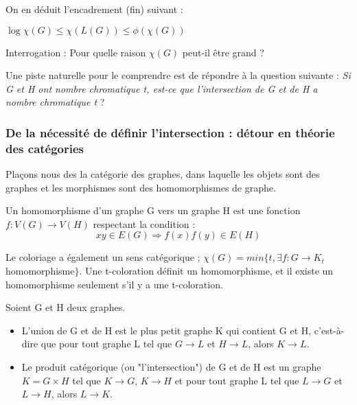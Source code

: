On en déduit l'encadrement (fin) suivant :

\begin{theoreme}
	$\log \chi(G) \le \chi(L(G)) \le \phi(\chi(G))$
\end{theoreme}

Interrogation : Pour quelle raison $\chi(G)$ peut-il être grand ?

Une piste naturelle pour le comprendre est de répondre à la question suivante : \textit{Si G et H ont nombre chromatique t, est-ce que l'intersection de G et de H a nombre chromatique t} ?

\subsubsection{De la nécessité de définir l'intersection : détour en théorie des catégories}

Plaçons nous des la catégorie des graphes, dans laquelle les objets sont des graphes et les morphismes sont des homomorphismes de graphe.

\begin{definition}	Un homomorphisme d'un graphe G vers un graphe H est une fonction $f : V(G) \longrightarrow V(H)$ respectant la condition :
	\begin{equation*}
		xy \in E(G) \Longrightarrow f(x)f(y) \in E(H)
	\end{equation*}
\end{definition}

Le coloriage a également un sens catégorique ; $\chi(G) = min\{t, \exists f : G \longrightarrow K_t \quad$ homomorphisme$\}$. Une t-coloration définit un homomorphisme, et il existe un homomorphisme seulement s'il y a une t-coloration.

\begin{definition}
	Soient G et H deux graphes.
	\begin{itemize}
		\item L'union de G et de H est le plus petit graphe K qui contient G et H, c'est-à-dire que pour tout graphe L tel que $G \longrightarrow L$ et $H \longrightarrow L$, alors $K \longrightarrow L$.
		\item Le produit catégorique (ou "l'intersection") de G et de H est un graphe $K = G\times H$ tel que $K \longrightarrow G$, $K \longrightarrow H$ et pour tout graphe L tel que $L \longrightarrow G$ et $L \longrightarrow H$, alors $L \longrightarrow K$.
	\end{itemize}
\end{definition}


